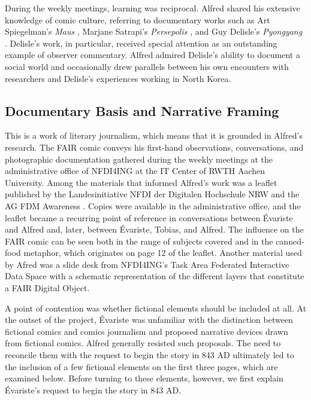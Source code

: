 \documentclass{inggrid}
\begin{document}
During the weekly meetings, learning was reciprocal. Alfred shared his extensive knowledge of comic culture, referring to documentary works such as Art Spiegelman's \textit{Maus} \cite{spiegelman_maus_1986}, Marjane Satrapi’s \textit{Persepolis} \cite{satrapi_persepolis_2003}, and Guy Delisle's \textit{Pyongyang} \cite{delisle_pyongyang_2003}. Delisle's work, in particular, received special attention as an outstanding example of observer commentary. Alfred admired Delisle's ability to document a social world and occasionally drew parallels between his own encounters with researchers and Delisle's experiences working in North Korea.

\subsection{Documentary Basis and Narrative Framing}
This is a work of literary journalism, which means that it is grounded in Alfred's research. The FAIR comic conveys his first-hand observations, conversations, and photographic documentation gathered during the weekly meetings at the administrative office of NFDI4ING at the IT Center of RWTH Aachen University. Among the materials that informed Alfred's work was a leaflet published by the Landesinitiative NFDI der Digitalen Hochschule NRW and the AG FDM Awareness \cite{landesinitiative_nfdi_der_digitalen_hochschule_nrw_nachnutzbare_2019}. Copies were available in the administrative office, and the leaflet became a recurring point of reference in conversations between Évariste and Alfred and, later, between Évariste, Tobias, and Alfred. The influence on the FAIR comic can be seen both in the range of subjects covered and in the canned-food metaphor, which originates on page 12 of the leaflet. Another material used by Afred was a slide desk from NFDI4ING's Task Area Federated Interactive Data Space with a schematic representation of the different layers that constitute a FAIR Digital Object.

A point of contention was whether fictional elements should be included at all. At the outset of the project, Évariste was unfamiliar with the distinction between fictional comics and comics journalism and proposed narrative devices drawn from fictional comics. Alfred generally resisted such proposals. The need to reconcile them with the request to begin the story in 843 AD ultimately led to the inclusion of a few fictional elements on the first three pages, which are examined below. Before turning to these elements, however, we first explain Évariste's request to begin the story in 843 AD.
\end{document}
